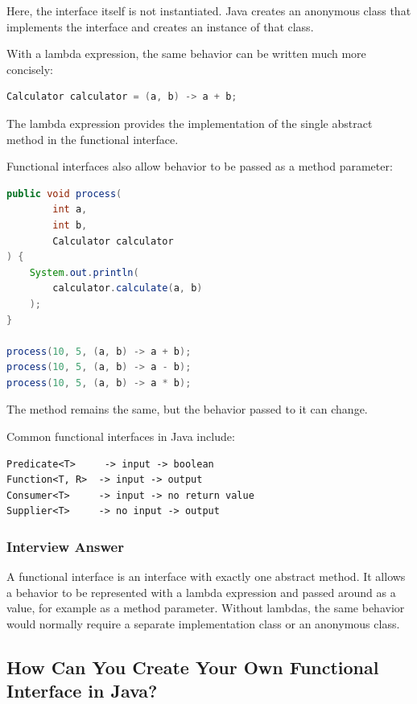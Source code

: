\documentclass[12pt,a4paper]{article}
\begin{document}
Here, the interface itself is not instantiated. Java creates an anonymous
class that implements the interface and creates an instance of that class.

With a lambda expression, the same behavior can be written much more
concisely:

\begin{lstlisting}[language=Java]
Calculator calculator = (a, b) -> a + b;
\end{lstlisting}

The lambda expression provides the implementation of the single abstract
method in the functional interface.

Functional interfaces also allow behavior to be passed as a method
parameter:

\begin{lstlisting}[language=Java]
public void process(
        int a,
        int b,
        Calculator calculator
) {
    System.out.println(
        calculator.calculate(a, b)
    );
}

process(10, 5, (a, b) -> a + b);
process(10, 5, (a, b) -> a - b);
process(10, 5, (a, b) -> a * b);
\end{lstlisting}

The method remains the same, but the behavior passed to it can change.

Common functional interfaces in Java include:

\begin{verbatim}
Predicate<T>     -> input -> boolean
Function<T, R>  -> input -> output
Consumer<T>     -> input -> no return value
Supplier<T>     -> no input -> output
\end{verbatim}

\subsubsection*{Interview Answer}

A functional interface is an interface with exactly one abstract method.
It allows a behavior to be represented with a lambda expression and passed
around as a value, for example as a method parameter. Without lambdas, the
same behavior would normally require a separate implementation class or an
anonymous class.

\subsection{How Can You Create Your Own Functional Interface in Java?}
\end{document}
